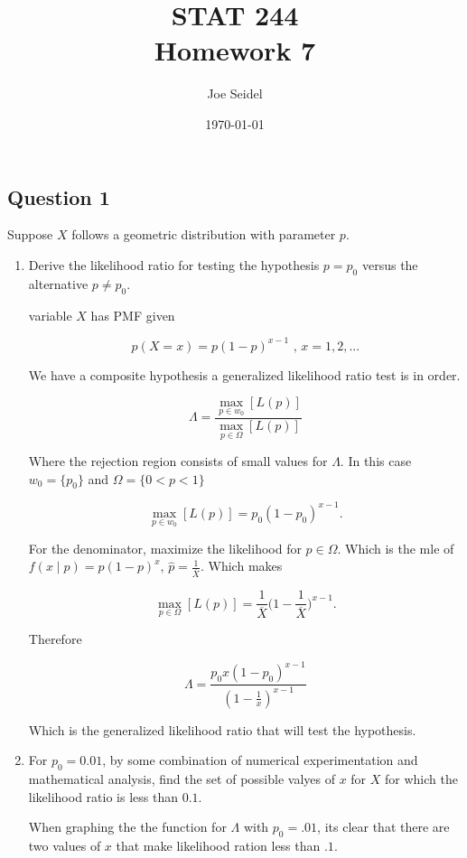 \documentclass{tufte-book}
\title{STAT 244 \\ Homework 7}
\author{Joe Seidel}
\date{\today}
\theoremstyle{mytheoremstyle}
\theoremstyle{mylemstyle}
\theoremstyle{mydefstyle}
\begin{document}
\maketitle
{}
\newpage
{}

\subsection{Question 1}
Suppose $X$ follows a geometric distribution with parameter $p$.

\begin{enumerate}

\item Derive the likelihood ratio for testing the hypothesis $p=p_0$ versus the alternative $p \neq p_0$.

 variable $X$ has PMF given

\[ p(X=x) = p(1-p)^{x-1} \text{ , } x=1,2,... \]

We have a composite hypothesis a generalized likelihood ratio test is in order.

\[ \Lambda = \frac{\max_{p \in w_0}[L(p)]}{\max_{p \in \Omega}[L(p)]} \]

Where the rejection region consists of small values for $\Lambda$.  In this case $w_0 = \{p_0\}$ and $\Omega = \{ 0 < p < 1\}$

\[ \max_{p \in w_0}[L(p)] = p_0(1-p_0)^{x-1}. \]

For the denominator, maximize the likelihood for $p \in \Omega$.  Which is the mle of $f(x \mid p) = p(1-p)^{x}$, $\hat{p} = \frac{1}{\overline{X}}$. Which makes

\[ \max_{p \in \Omega}[L(p)] = \frac{1}{\overline{X}}\Big(1-\frac{1}{\overline{X}}\Big)^{x-1}. \]

Therefore 

\[ \Lambda = \frac{p_0x(1-p_0)^{x-1}}{(1-\frac{1}{x})^{x-1}} \]

Which is the generalized likelihood ratio that will test the hypothesis.

\item For $p_0=0.01$, by some combination of numerical experimentation and mathematical analysis, find the set of possible valyes of $x$ for $X$ for which the likelihood ratio is less than $0.1$.

When graphing the the function  for $\Lambda$ with $p_0=.01$, its clear that there are two values of $x$ that make likelihood ration less than $.1$.


\end{enumerate}
\end{document}
